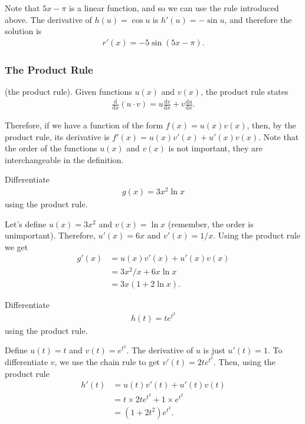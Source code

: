 Note that $5x-\pi$ is a linear function, and so we can use the rule introduced above. The derivative of $h(u) = \cos u$ is $h'(u) = -\sin u$, and therefore the solution is
\begin{align*}
    r'(x) = -5\sin(5x-\pi).
\end{align*}

\subsubsection{The Product Rule}

\begin{definition}
    (the product rule). Given functions $u(x)$ and $v(x)$, the product rule states
    \begin{align}
        \label{product} \frac{\mathrm{d}}{\mathrm{d}x} (u\cdot v)= u\frac{\mathrm{d}v}{\mathrm{d}x} + v\frac{\mathrm{d}u}{\mathrm{d}x}.
    \end{align}
\end{definition}

Therefore, if we have a function of the form $f(x)=u(x)v(x)$, then, by the product rule, its derivative is $f'(x)=u(x)v'(x)+u'(x)v(x)$. Note that the order of the functions $u(x)$ and $v(x)$ is not important, they are interchangeable in the definition.

\begin{example}
    Differentiate
    \begin{align*}
        g(x) = 3x^2 \ln x
    \end{align*}
    using the product rule.
\end{example}

Let's define $u(x) = 3x^2$ and $v(x) = \ln x$ (remember, the order is unimportant). Therefore, $u'(x) = 6x$ and $v'(x) = 1/x$. Using the product rule we get
\begin{align*}
    g'(x) &= u(x)v'(x)+u'(x)v(x) \\
    &= 3x^2 / x + 6x \ln x \\
    &= 3x (1 + 2\ln x).
\end{align*}

\begin{example}
    Differentiate
    \begin{align*}
        h(t)=te^{t^2}
    \end{align*}
    using the product rule.
\end{example}

Define $u(t)=t$ and $v(t)=e^{t^2}$. The derivative of $u$ is just $u'(t)=1$. To differentiate $v$, we use the chain rule to get $v'(t) = 2t e^{t^2}$. Then, using the product rule
\begin{align*}
    h'(t) &= u(t)v'(t)+u'(t)v(t) \\
    &= t \times 2te^{t^2} + 1\times e^{t^2} \\
    &= (1+2t^2)e^{t^2}.
\end{align*}

